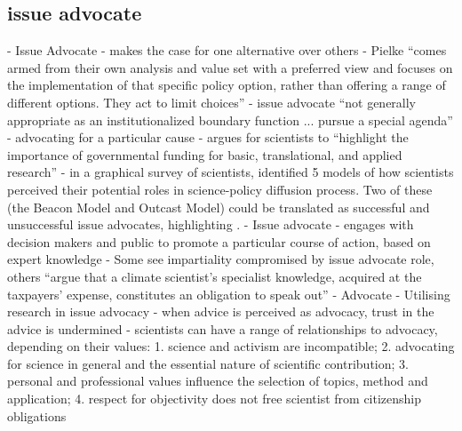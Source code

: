 \subsection{issue advocate}
\cite{Pielke2007} - Issue Advocate - makes the case for one alternative over others
\cite{GregoryBW2024} - Pielke ``comes armed from their own analysis and value set with a preferred view and focuses on the implementation of that specific policy option, rather than offering a range of different options. They act to limit choices''
\cite{GluckmanBK2021} - issue advocate ``not generally appropriate as an institutionalized boundary function ... pursue a special agenda''
\cite{BalvaneraJNOBCDGGKKMPSSW2020} - advocating for a particular cause
\cite{ElsensohnACDGGKPRS2019} - argues for scientists to ``highlight the importance of governmental funding for basic, translational, and applied research''
\cite{KalafatisL2019} - in a graphical survey of scientists, identified 5 models of how scientists perceived their potential roles in science-policy diffusion process. Two of these (the Beacon Model and Outcast Model) could be translated as successful and unsuccessful issue advocates, highlighting .
\cite{RapleyD2014} - Issue advocate - engages with decision makers and public to promote a particular course of action, based on expert knowledge - Some see impartiality compromised by issue advocate role, others ``argue that a climate scientist's specialist knowledge, acquired at the taxpayers' expense, constitutes an obligation to speak out''
\cite{KarkkainenLKK2024} - Advocate - Utilising research in issue advocacy
\cite{Gluckman2014} - when advice is perceived as advocacy, trust in the advice is undermined
\cite{RykielEtAl2002} - scientists can have a range of relationships to advocacy, depending on their values: 1. science and activism are incompatible; 2. advocating for science in general and the essential nature of scientific contribution; 3. personal and professional values influence the selection of topics, method and application; 4. respect for objectivity does not free scientist from citizenship obligations

